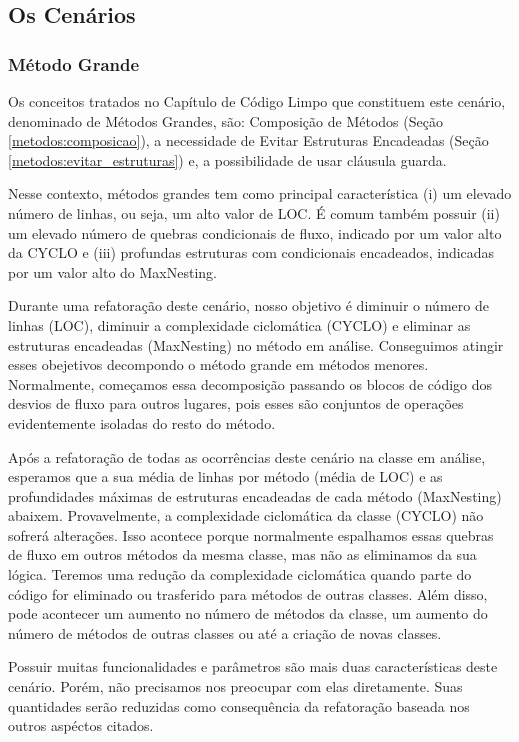 \subsection{Os Cenários}

\subsubsection{Método Grande}

Os conceitos tratados no Capítulo de Código Limpo que constituem este cenário, denominado de Métodos Grandes, são: Composição de Métodos (Seção \ref{metodos:composicao}), a necessidade de Evitar Estruturas Encadeadas (Seção \ref{metodos:evitar_estruturas}) e, a possibilidade de usar cláusula guarda.
	
Nesse contexto, métodos grandes tem como principal característica (i) um elevado número de linhas, ou seja, um alto valor de LOC. É comum também possuir (ii) um elevado número de quebras condicionais de fluxo, indicado por um valor alto da CYCLO e (iii) profundas estruturas com condicionais encadeados, indicadas por um valor alto do MaxNesting.
                                               
Durante uma refatoração deste cenário, nosso objetivo é diminuir o número de linhas (LOC), diminuir a complexidade ciclomática (CYCLO) e eliminar as estruturas encadeadas (MaxNesting) no método em análise. Conseguimos atingir esses obejetivos decompondo o método grande em métodos menores. Normalmente, começamos essa decomposição passando os blocos de código dos desvios de fluxo para outros lugares, pois esses são conjuntos de operações evidentemente isoladas do resto do método.
                                                
Após a refatoração de todas as ocorrências deste cenário na classe em análise, esperamos que a sua média de linhas por método (média de LOC) e as profundidades máximas de estruturas encadeadas de cada método (MaxNesting) abaixem. Provavelmente, a complexidade ciclomática da classe (CYCLO) não sofrerá alterações. Isso acontece porque normalmente espalhamos essas quebras de fluxo em outros métodos da mesma classe, mas não as eliminamos da sua lógica. Teremos uma redução da complexidade ciclomática quando parte do código for eliminado ou trasferido para métodos de outras classes. Além disso, pode acontecer um aumento no número de métodos da classe, um aumento do número de métodos de outras classes ou até a criação de novas classes.

Possuir muitas funcionalidades e parâmetros são mais duas características deste cenário. Porém, não precisamos nos preocupar com elas diretamente. Suas quantidades serão reduzidas como consequência da refatoração baseada nos outros aspéctos citados.

